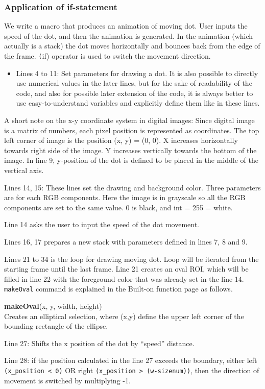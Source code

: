 \documentclass[11pt,a4paper,oneside]{report}
\newenvironment{indentCom}%
{\begin{list}{}%
         {\setlength{\leftmargin}{1em}}%
         \item[]%
}
{\end{list}}
\newcommand{\ilcom}[1]{\texttt{\small#1}}
\begin{document}
\subsubsection{Application of if-statement}
\label{sec:dotmove}

We write a macro that produces an animation of moving dot. User inputs the speed
of the dot, and then the animation is generated. In the animation (which
actually is a stack) the dot moves horizontally and bounces back from the edge
of the frame. \ilcom(if) operator is used to switch the movement direction.


\begin{itemize}
\item Lines 4 to 11: Set parameters for drawing a dot. It is also possible to directly use numerical values in the later lines, but for the sake of readability of the code, and also for possible later extension of the code, it is always better to use easy-to-understand variables and explicitly define them like in these lines. 
\end{itemize}
A short note on the x-y coordinate system in digital images: Since digital image is a matrix of numbers, each pixel position is represented as coordinates. The top left corner of image is the position (x, y) = (0, 0). X increases horizontally towards right side of the image. Y increases vertically towards the bottom of the image.  In line 9, y-position of the dot is defined to be placed in the middle of the vertical axis. 
\begin{itemize}
\item Lines 14, 15: These lines set the drawing and background color. Three parameters are for each RGB components. Here the image is in grayscale so all the RGB components are set to the same value. 0 is black, and int = 255 = white.
\item Line 14 asks the user to input the speed of the dot movement.
\item Lines 16, 17 prepares a new stack with parameters defined in lines 7, 8 and 9.
\item Lines 21 to 34 is the loop for drawing moving dot. Loop will be iterated from the starting frame until the last frame. Line 21 creates an oval ROI, which will be filled in line 22 with the foreground color that was already set in the line 14. \ilcom{makeOval} command is explained in the Built-on function page as follows.

\begin{indentCom}
\textbf{makeOval}(x, y, width, height)\\
Creates an elliptical selection, where (x,y) define the upper left corner of the bounding rectangle of the ellipse. 
\end{indentCom}
\item Line 27: Shifts the x position of the dot by ``speed'' distance. 
\item Line 28: if the position calculated in the line 27 exceeds the boundary, either left \ilcom{(x\_position < 0)} OR right \ilcom{(x\_position > (w-sizenum))}, then the direction of movement is switched by multiplying -1.
\end{itemize}
\end{document}
